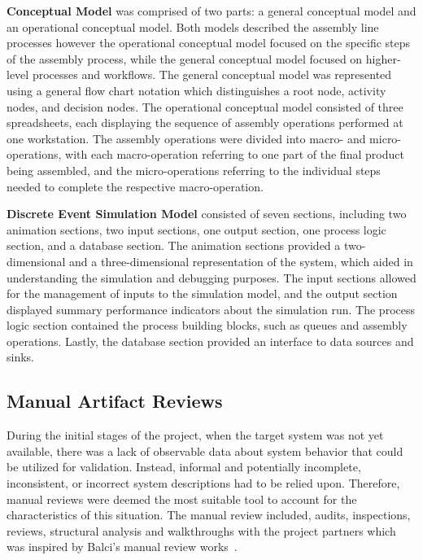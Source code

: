 \documentclass{llncs}
\begin{document}
    \textbf{Conceptual Model} was comprised of two parts: a general conceptual model and an operational conceptual model. 
    Both models described the assembly line processes however the operational conceptual model focused on the specific steps of the assembly process, while the general conceptual model focused on higher-level processes and workflows.
    The general conceptual model was represented using a general flow chart notation which distinguishes a root node, activity nodes, and decision nodes.
    The operational conceptual model consisted of three spreadsheets, each displaying the sequence of assembly operations performed at one workstation. 
    The assembly operations were divided into macro- and micro-operations, with each macro-operation referring 
    to one part of the final product being assembled, and the micro-operations referring to the individual steps needed to complete the respective macro-operation.

    \textbf{Discrete Event Simulation Model} consisted of seven sections, including two animation sections, two input sections, one output section, one process logic section, and a database section. 
    The animation sections provided a two-dimensional and a three-dimensional representation of the system, 
    which aided in understanding the simulation and debugging purposes. The input sections allowed for the management of inputs to the simulation model, and the output section displayed summary performance indicators about the simulation run. 
    The process logic section contained the process building blocks, such as queues and assembly operations. Lastly, the database section provided an interface to data sources and sinks.
    
    \subsection{Manual Artifact Reviews}
    During the initial stages of the project, when the target system was not yet available,
    there was a lack of observable data about system behavior that could be utilized for validation. 
    Instead, informal and potentially incomplete, inconsistent, or incorrect system descriptions had to be relied upon. 
    Therefore, manual reviews were deemed the most suitable tool to account for the characteristics of this situation.
    The manual review included, audits, inspections, reviews, structural analysis and walkthroughs 
    with the project partners which was inspired by Balci's manual review works~\cite{balcitechniques}. 
    
\end{document}
